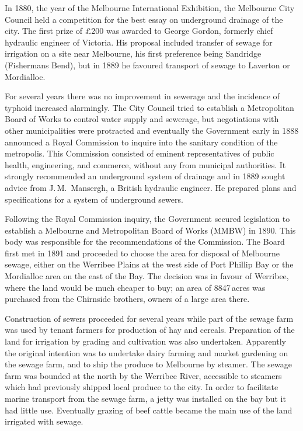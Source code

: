 In 1880, the year of the Melbourne International Exhibition,
 the
Melbourne City Council held a competition for the best essay on
underground drainage of the city.  The first prize of \pounds200 was
awarded to George Gordon,  formerly chief hydraulic
engineer of Victoria.  His proposal included transfer of sewage for
irrigation on a site near Melbourne, his first preference being
Sandridge (Fishermans Bend), but in 1889 he favoured transport of
sewage to Laverton or Mordialloc.

For several years there was no improvement in sewerage and the
incidence of typhoid increased alarmingly.  The City Council tried to
establish a Metropolitan Board of Works to control water supply and
sewerage, but negotiations with other municipalities were protracted
and eventually the Government early in 1888 announced a Royal
Commission to inquire into the sanitary condition of the
metro\-po\-lis.  This Commission consisted of eminent representatives
of public health, engineering, and commerce, without any from
municipal authorities.  It strongly recommended an underground system
of drainage and in 1889 sought advice from J.\,M.~Mansergh,
 a British hydraulic engineer.  He prepared
plans and specifications for a system of underground
sewers.

Following the Royal Commission inquiry, the Government secured
legislation to establish a Melbourne and Metropolitan Board of Works
(MMBW)  in 1890.  This
body was responsible for the recommendations of the Commission.  The
Board first met in 1891 and proceeded to choose the area for disposal
of Melbourne sewage, either on the Werribee Plains at the west side of
Port Phillip Bay or the Mordialloc area on the east of the Bay.  The
decision was in favour of Werribee, 
where the land would be much cheaper to buy; an area of 8847\,acres
was purchased from the Chirnside brothers, owners of a large area
there.

Construction of sewers proceeded for several years while part of the
sewage farm was used by tenant farmers for production of hay and
cereals.  Preparation of the land for irrigation by grading and
cultivation was also undertaken.  Apparently the original intention
was to undertake dairy farming and market gardening on the sewage
farm, and to ship the produce to Melbourne by steamer. The sewage farm
was bounded at the north by the Werribee River, 
accessible to steamers which had previously shipped local produce to
the city.  In order to facilitate marine transport from the sewage
farm, a jetty was installed on the bay but it had little use.
Eventually grazing of beef cattle became the main use of the land
irrigated with sewage.

